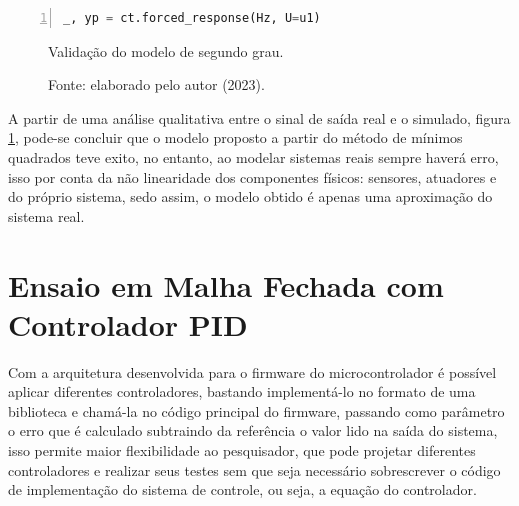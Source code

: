 \begin{lstlisting}[language=python, numbers=left, label=py3, caption={Obtendo a resposta forçada da função de transferência obtida.}]
_, yp = ct.forced_response(Hz, U=u1)
\end{lstlisting}


\begin{figure}[!h]
	\centering
	\caption{Validação do modelo de segundo grau.}
	\caption*{Fonte: elaborado pelo autor (2023).}
	\label{fig3:image_22}
\end{figure}


A partir de uma análise qualitativa entre o sinal de saída real e o simulado, figura \ref{fig3:image_22}, pode-se concluir que o modelo proposto a partir do método de mínimos quadrados teve exito, no entanto, ao modelar sistemas reais sempre haverá erro, isso por conta da não linearidade dos componentes físicos: sensores, atuadores e do próprio sistema, sedo assim, o modelo obtido é apenas uma aproximação do sistema real. %


\section{Ensaio em Malha Fechada com Controlador PID}
\label{malha_fechada}

Com a arquitetura desenvolvida para o firmware do microcontrolador é possível aplicar diferentes controladores, bastando implementá-lo no formato de uma biblioteca e chamá-la no código principal do firmware, passando como parâmetro o erro que é calculado subtraindo da referência o valor lido na saída do sistema, isso permite maior flexibilidade ao pesquisador, que pode projetar diferentes controladores e realizar seus testes sem que seja necessário sobrescrever o código de implementação do sistema de controle, ou seja, a equação do controlador.

